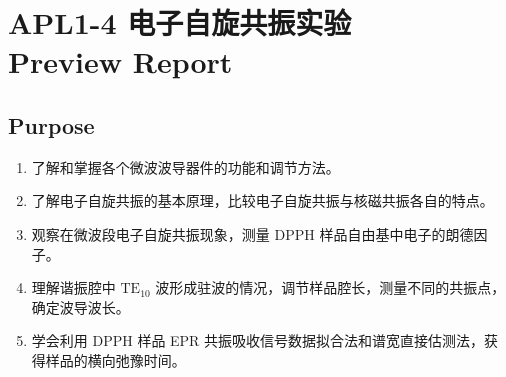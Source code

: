 
\setcounter{section}{0}
\section{APL1-4 电子自旋共振实验 \\ Preview Report}


\subsection{Purpose}
\begin{enumerate}
	\item 了解和掌握各个微波波导器件的功能和调节方法。
	\item 了解电子自旋共振的基本原理，比较电子自旋共振与核磁共振各自的特点。
	\item 观察在微波段电子自旋共振现象，测量 DPPH 样品自由基中电子的朗德因子。
	\item 理解谐振腔中 $\mathrm{TE}_{10}$ 波形成驻波的情况，调节样品腔长，测量不同的共振点，确定波导波长。
	\item 学会利用 DPPH 样品 EPR 共振吸收信号数据拟合法和谱宽直接估测法，获得样品的横向弛豫时间。
	
\end{enumerate}


